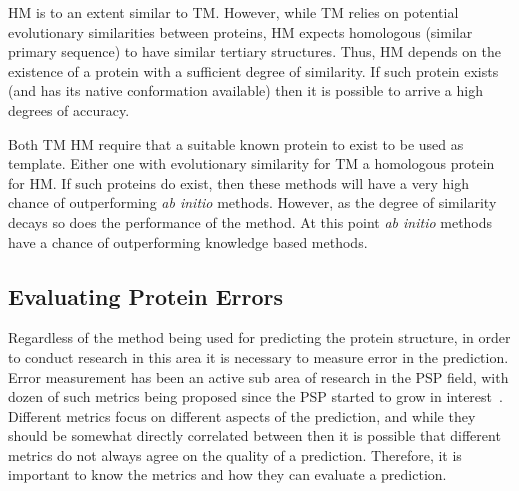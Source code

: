 \ac{HM} is to an extent similar to \ac{TM}. However, while \ac{TM} relies on potential evolutionary similarities between proteins, HM expects homologous (similar primary sequence) to have similar tertiary structures. Thus, HM depends on the existence of a protein with a sufficient degree of similarity. If such protein exists (and has its native conformation available) then it is possible to arrive a high degrees of accuracy.

Both \ac{TM} HM require that a suitable known protein to exist to be used as template. Either one with evolutionary similarity for \ac{TM} a homologous protein for HM. If such proteins do exist, then these methods will have a very high chance of outperforming \textit{ab initio} methods. However, as the degree of similarity decays so does the performance of the method. At this point \textit{ab initio} methods have a chance of outperforming knowledge based methods.

\subsection{Evaluating Protein Errors}\label{sec:protein-metrics}

Regardless of the method being used for predicting the protein structure,
in order to conduct research in this area it is necessary to measure error
in the prediction. Error measurement has been an active sub area of research
in the \ac{PSP} field, with dozen of such metrics being proposed since the
\ac{PSP} started to grow in interest~\cite{xu2010significant,zhang2005tm,siew2000maxsub}.
Different metrics focus on different aspects of the prediction, and while they should be somewhat directly correlated between then it is possible that different metrics do not always agree on the quality of a prediction. Therefore, it is important to know the metrics and how they can evaluate a prediction.

